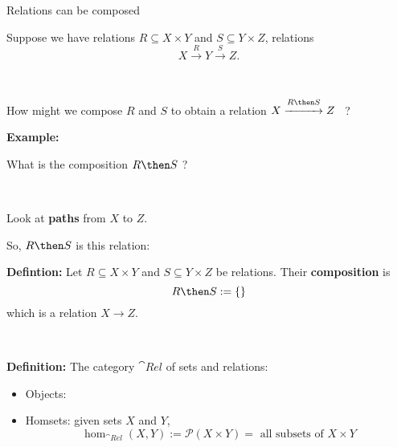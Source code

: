 \begin{frame}[fragile]{Relations can be composed}

Suppose we have relations $R \subseteq X \times Y$ and $S \subseteq Y \times Z$,  relations
$$
X \overset{R}{\longrightarrow} Y \overset{S}{\longrightarrow} Z.
$$

\

How might we compose $R$ and $S$ to obtain a relation $X \overset{R \then S}{\xrightarrow{\hspace*{1cm}}} Z$ \ ?

\vfill \vfill \vfill \vfill \vfill \vfill \vfill \vfill 

\end{frame}



\begin{frame}[fragile]

\textbf{Example:} 


\vfill \vfill \vfill \vfill \vfill \vfill 

What is the composition $R \then S$ ? 

\

Look at \textbf{paths} from $X$ to $Z$. 
\end{frame}




\begin{frame}[fragile]

\vfill \vfill \vfill \vfill \vfill \vfill 

So, $R \then S$ is this relation:

\vfill \vfill \vfill \vfill \vfill \vfill 

\end{frame}





\begin{frame}[fragile]

\textbf{Defintion:}  Let $R \subseteq X \times Y$ and $S \subseteq Y \times Z$ be relations. Their \textbf{composition} is
$$
R \then S := \{ \}
$$
which is a relation $X \rightarrow Z$. 

\

\textbf{Definition:} The category $\cat{Rel}$ of sets and relations:
\begin{itemize}
\item Objects: 
\item Homsets: given sets $X$ and $Y$, 
$$
\hom_{\cat{Rel}}(X,Y) := \mathcal{P}(X \times Y) = \text{ all subsets of $X \times Y$}
$$
\end{itemize}


\vfill \vfill \vfill \vfill \vfill \vfill 
\end{frame}






